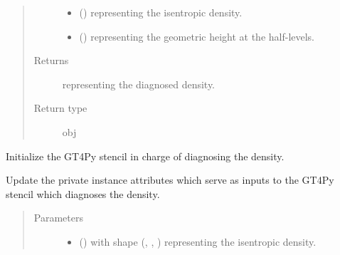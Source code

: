 \documentclass[letterpaper,10pt,english]{sphinxmanual}
\begin{document}
\begin{fulllineitems}
\begin{fulllineitems}
\begin{quote}
\begin{description}
\begin{itemize}
\item {} 
 () \textendash{}  representing the isentropic density.

\item {} 
 () \textendash{}  representing the geometric height at the half-levels.

\end{itemize}

\item[{Returns}] \leavevmode
{} representing the diagnosed density.

\item[{Return type}] \leavevmode
obj

\end{description}\end{quote}

\end{fulllineitems}


\begin{fulllineitems}
\label{\detokenize{api:dycore.diagnostic_isentropic.DiagnosticIsentropic._stencil_diagnosing_air_density_initialize}}
Initialize the GT4Py stencil in charge of diagnosing the density.

\end{fulllineitems}


\begin{fulllineitems}
\label{\detokenize{api:dycore.diagnostic_isentropic.DiagnosticIsentropic._stencil_diagnosing_air_density_set_inputs}}
Update the private instance attributes which serve as inputs to the GT4Py stencil which diagnoses the density.
\begin{quote}\begin{description}
\item[{Parameters}] \leavevmode\begin{itemize}
\item {} 
 () \textendash{}  with shape (, , ) representing the isentropic density.


\end{itemize}
\end{description}
\end{quote}
\end{fulllineitems}
\end{fulllineitems}
\end{document}
